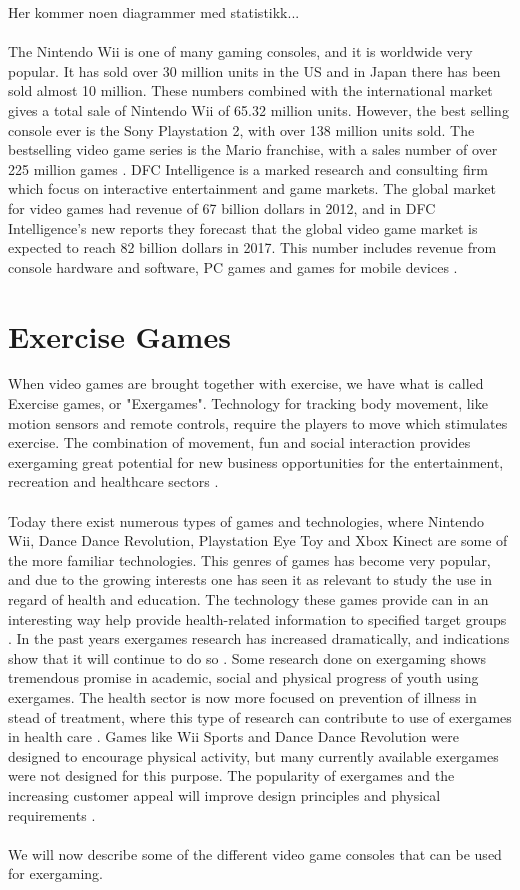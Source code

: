 Her kommer noen diagrammer med statistikk... \\ \\
The Nintendo Wii is one of many gaming consoles, and it is worldwide very popular. It has sold over 30 million units in the US and in Japan there has been sold almost 10 million. These numbers combined with the international market gives a total sale of Nintendo Wii of 65.32 million units. However, the best selling console ever is the Sony Playstation 2, with over 138 million units sold. The bestselling video game series is the Mario franchise, with a sales number of over 225 million games \cite{statistics2012}. DFC Intelligence is a marked research and consulting firm which focus on interactive entertainment and game markets. The global market for video games had revenue of 67 billion dollars in 2012, and in DFC Intelligence's new reports they forecast that the global video game market is expected to reach 82 billion dollars in 2017. This number includes revenue from console hardware and software, PC games and games for mobile devices \cite{videogameforcast} \cite{aboutdfcint}.

\section{Exercise Games}
When video games are brought together with exercise, we have what is called Exercise games, or "Exergames". Technology for tracking body movement, like motion sensors and remote controls, require the players to move which stimulates exercise. The combination of movement, fun and social interaction provides exergaming great potential for new business opportunities for the entertainment, recreation and healthcare sectors \cite{gamingforhealth}. \\ \\
Today there exist numerous types of games and technologies, where Nintendo Wii, Dance Dance Revolution, Playstation Eye Toy and Xbox Kinect are some of the more familiar technologies. This genres of games has become very popular, and due to the growing interests one has seen it as relevant to study the use in regard of health and education. The technology these games provide can in an interesting way help provide health-related information to specified target groups \cite{gamingforhealth}. In the past years exergames research has increased dramatically, and indications show that it will continue to do so \cite{chamberlin2008exergames}. Some research done on exergaming shows tremendous promise in academic, social and physical progress of youth using exergames. The health sector is now more focused on prevention of illness in stead of treatment,  where this type of research can contribute to use of exergames in health care \cite{gamingforhealth}. Games like Wii Sports and Dance Dance Revolution were designed to encourage physical activity, but many currently available exergames were not designed for this purpose. The popularity of exergames and the increasing customer appeal will improve design principles and physical requirements \cite{chamberlin2008exergames}. \\ \\
We will now describe some of the different video game consoles that can be used for exergaming.
